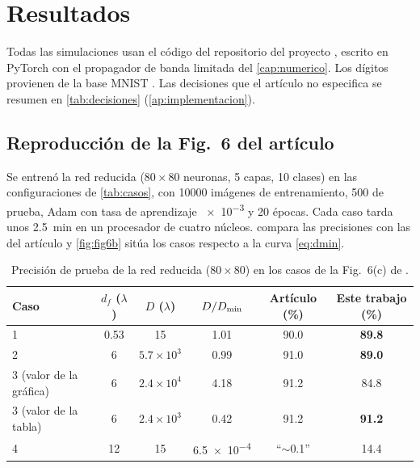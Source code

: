 \chapter{Resultados}\label{cap:resultados}

Todas las simulaciones usan el código del repositorio del proyecto \parencite{repo2026},
escrito en PyTorch \parencite{paszke2019} con el propagador de banda limitada del
\cref{cap:numerico}. Los dígitos provienen de la base MNIST \parencite{lecun1998}. Las
decisiones que el artículo no especifica se resumen en \cref{tab:decisiones}
(\cref{ap:implementacion}).

\section{Reproducción de la Fig.~6 del artículo}\label{sec:fig6}

Se entrenó la red reducida ($80\times80$ neuronas, 5 capas, 10 clases) en las configuraciones
de \cref{tab:casos}, con \num{10000} imágenes de entrenamiento, 500 de prueba, Adam con tasa
de aprendizaje \num{e-3} y 20 épocas. Cada caso tarda unos \SI{2.5}{min} en un procesador de
cuatro núcleos.  compara las precisiones con las del artículo y \cref{fig:fig6b}
sitúa los casos respecto a la curva \eqref{eq:dmin}.

\begin{table}[htbp]
\centering
\caption[Reproducción de la Fig.~6(c) del artículo]{Precisión de prueba de la red
reducida ($80\times80$) en los casos de la Fig.~6(c) de \textcite{chen2021}.}
\label{tab:fig6}
\begin{tabular}{@{}lccccc@{}}
\toprule
Caso & $d_f$ ($\lambda$) & $D$ ($\lambda$) & $D/D_{\min}$ & Artículo (\%) & Este trabajo (\%)\\
\midrule
1 & 0.53 & 15 & 1.01 & 90.0 & \textbf{89.8}\\
2 & 6 & $5.7\times10^3$ & 0.99 & 91.0 & \textbf{89.0}\\
3 (valor de la gráfica) & 6 & $2.4\times10^4$ & 4.18 & 91.2 & 84.8\\
3 (valor de la tabla) & 6 & $2.4\times10^3$ & 0.42 & 91.2 & \textbf{91.2}\\
4 & 12 & 15 & \num{6.5e-4} & ``$\sim$0.1'' & 14.4\\
\bottomrule
\end{tabular}
\end{table}

